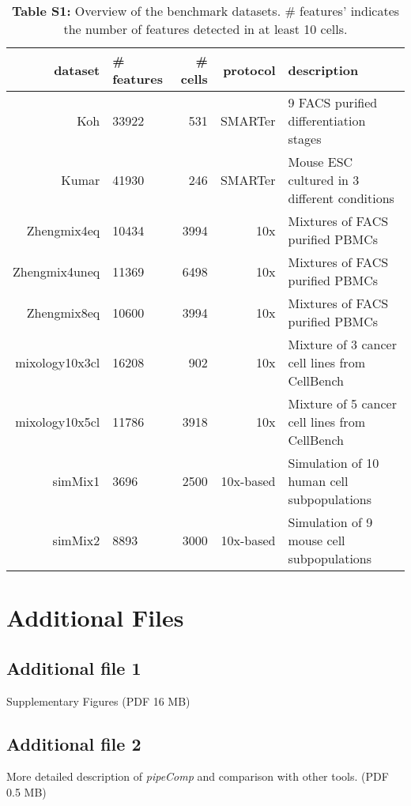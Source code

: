 \documentclass{bmcart}
\begin{document}
\begin{backmatter}
\begin{table}[h!]
\caption{{\color{red} \textbf{Table S1:} Overview of the benchmark datasets.} \# features' indicates the number of features detected in at least 10 cells.}
\label{tab:table1}
\begin{tabular}{rlrrl}
  \hline
dataset & \# features & \# cells & protocol & description \\ 
  \hline
Koh & 33922 & 531 & SMARTer & 9 FACS purified differentiation stages \\ 
  Kumar & 41930 & 246 & SMARTer & Mouse ESC cultured in 3 different conditions \\ 
  Zhengmix4eq & 10434 & 3994 & 10x & Mixtures of FACS purified PBMCs \\ 
  Zhengmix4uneq & 11369 & 6498 & 10x & Mixtures of FACS purified PBMCs \\ 
  Zhengmix8eq & 10600 & 3994 & 10x & Mixtures of FACS purified PBMCs \\ 
  mixology10x3cl & 16208 & 902 & 10x & Mixture of 3  cancer cell lines from CellBench \\ 
  mixology10x5cl & 11786 & 3918 & 10x & Mixture of 5 cancer cell lines from CellBench \\ 
  simMix1 & 3696 & 2500 & 10x-based & Simulation of 10 human cell subpopulations \\
  simMix2 & 8893 & 3000 & 10x-based & Simulation of 9 mouse cell subpopulations \\
   \hline
\end{tabular}
\end{table}



\section*{Additional Files}
  \subsection*{\textbf{Additional file 1}}
  Supplementary Figures (PDF 16 MB)
  \subsection*{\textbf{Additional file 2}}
  More detailed description of \textit{pipeComp} and comparison with other tools. (PDF 0.5 MB)
\end{backmatter}
\end{document}
